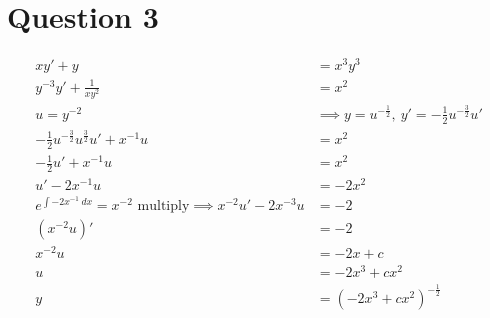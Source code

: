 \documentclass{article}
\begin{document}
\section*{Question 3}
\begin{align*}
    xy'+y                                                                   & =x^3y^3                                                          \\
    y^{-3}y'+\frac{1}{xy^2}                                                 & =x^2                                                             \\
    u=y^{-2}                                                                & \implies y= u^{-\frac{1}{2}},\ y'=-\frac{1}{2}u^{-\frac{3}{2}}u' \\
    -\frac{1}{2}u^{-\frac{3}{2}}u^\frac{3}{2}u'+x^{-1}u                     & =x^2                                                             \\
    -\frac{1}{2}u'+x^{-1}u                                                  & =x^2                                                             \\
    u'-2x^{-1}u                                                             & =-2x^2                                                           \\
    e^{\int -2x^{-1}\:dx}=x^{-2}\text{ multiply} \implies x^{-2}u'-2x^{-3}u & =-2                                                              \\
    (x^{-2}u)'                                                              & =-2                                                              \\
    x^{-2}u                                                                 & =-2x+c                                                           \\
    u                                                                       & =-2x^3+cx^2                                                      \\
    y                                                                       & =(-2x^3+cx^2)^{-\frac{1}{2}}                                     \\
\end{align*}
\end{document}

